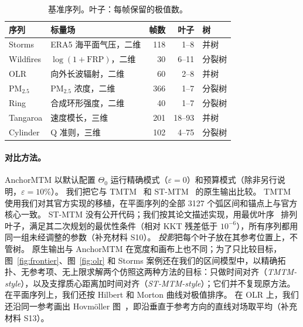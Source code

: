\documentclass[fontset=none,zihao=5,a4paper]{ctexart}
\begin{document}
\begin{table}[tbp]
\caption{基准序列。叶子：每帧保留的极值数。}\label{tab:data}
\centering\small
\begin{tabular}{llrrl}\toprule
序列 & 标量场 & 帧数 & 叶子 & 树\\\midrule
Storms & ERA5 海平面气压，二维 & 118 & 1--8 & 并树\\
Wildfires & $\log(1+\mathrm{FRP})$，二维 & 30 & 6--11 & 分裂树\\
OLR & 向外长波辐射，二维 & 60 & 2--8 & 并树\\
PM$_{2.5}$ & PM$_{2.5}$ 浓度，二维 & 366 & 1--7 & 分裂树\\
Ring & 合成环形强度，二维 & 40 & 1--7 & 分裂树\\
Tangaroa & 速度模长，三维 & 201 & 18--93 & 并树\\
Cylinder & Q 准则，三维 & 102 & 4--75 & 分裂树\\\bottomrule
\end{tabular}
\end{table}

\paragraph{对比方法。}
AnchorMTM 以默认配置 $\Theta_0$ 运行精确模式（$\varepsilon=0$）和预算模式（除非另行说明，$\varepsilon=10\%$）。
我们把它与 TMTM~\cite{Koepp:2023:TMTM} 和 ST-MTM~\cite{STMTM:2026} 的原生输出比较。
TMTM 使用我们对其官方实现的移植，在平面序列的全部 3127 个弧区间和锚点上与官方核心一致。
ST-MTM 没有公开代码；我们按其论文描述实现，用最优叶序~\cite{BarJoseph:2001:OLO} 排列叶子，满足其二次规划的最优性条件（相对 KKT 残差低于 $10^{-6}$），所有序列都用同一组未经调整的参数（补充材料 S10）。
\emph{投影}把每个叶子放在其参考位置上，不管树。
原生输出与 AnchorMTM 在宽度和画布上也不同；为了只比较目标，图~\ref{fig:frontier}、图~\ref{fig:olr} 和 Storms 案例还在我们的区间模型中，以精确拓扑、无参考项、无上限求解两个仿照这两种方法的目标：只做时间对齐（\emph{TMTM-style}），以及支撑质心距离加时间对齐（\emph{ST-MTM-style}）；它们并不复现原方法。
在平面序列上，我们还按 Hilbert 和 Morton 曲线对极值排序。
在 OLR 上，我们还沿同一参考画出 Hovm\"oller 图~\cite{Hovmoller:1949}，即沿垂直于参考方向的直线对场取平均（补充材料 S13）。
\end{document}
